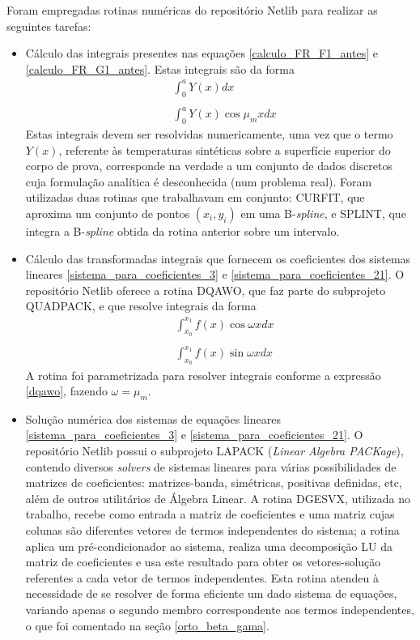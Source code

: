 Foram empregadas rotinas numéricas do repositório Netlib para realizar as seguintes tarefas:
\begin{itemize}
	\item Cálculo das integrais presentes nas equações \eqref{calculo_FR_F1_antes} e \eqref{calculo_FR_G1_antes}. Estas integrais são da forma
	\begin{align}
	& \int_0^a Y(x)dx \\ \nonumber \\
	& \int_0^a Y(x)\cos\mu_m x dx
	\end{align}
	Estas integrais devem ser resolvidas numericamente, uma vez que o termo $Y(x)$, referente às temperaturas sintéticas sobre a superfície superior do corpo de prova, corresponde na verdade a um conjunto de dados discretos cuja formulação analítica é desconhecida (num problema real). Foram utilizadas duas rotinas que trabalhavam em conjunto: CURFIT, que aproxima um conjunto de pontos $(x_i, y_i)$ em uma B-\textit{spline}, e SPLINT, que integra a B-\textit{spline} obtida da rotina anterior sobre um intervalo.
	
	\item Cálculo das transformadas integrais que fornecem os coeficientes dos sistemas lineares \eqref{sistema_para_coeficientes_3} e \eqref{sistema_para_coeficientes_21}. O repositório Netlib oferece a rotina DQAWO, que faz parte do subprojeto QUADPACK, e que resolve integrais da forma
	\begin{align}
	& \int_{x_0}^{x_1} f(x)\cos\omega x dx \label{dqawo} \\ \nonumber \\
	& \int_{x_0}^{x_1} f(x)\sin\omega x dx 
	\end{align}
	A rotina foi parametrizada para resolver integrais conforme a expressão \eqref{dqawo}, fazendo $\omega = \mu_m$.
	
	\item Solução numérica dos sistemas de equações lineares \eqref{sistema_para_coeficientes_3} e \eqref{sistema_para_coeficientes_21}. O repositório Netlib possui o subprojeto LAPACK (\textit{Linear Algebra PACKage}), contendo diversos \textit{solvers} de sistemas lineares para várias possibilidades de matrizes de coeficientes: matrizes-banda, simétricas, positivas definidas, etc, além de outros utilitários de Álgebra Linear. A rotina DGESVX, utilizada no trabalho, recebe como entrada a matriz de coeficientes e uma matriz cujas colunas são diferentes vetores de termos independentes do sistema; a rotina aplica um pré-condicionador ao sistema, realiza uma decomposição LU da matriz de coeficientes e usa este resultado para obter os vetores-solução referentes a cada vetor de termos independentes. Esta rotina atendeu à necessidade de se resolver de forma eficiente um dado sistema de equações, variando apenas o segundo membro correspondente aos termos independentes, o que foi comentado na seção \ref{orto_beta_gama}.
	

\end{itemize}
